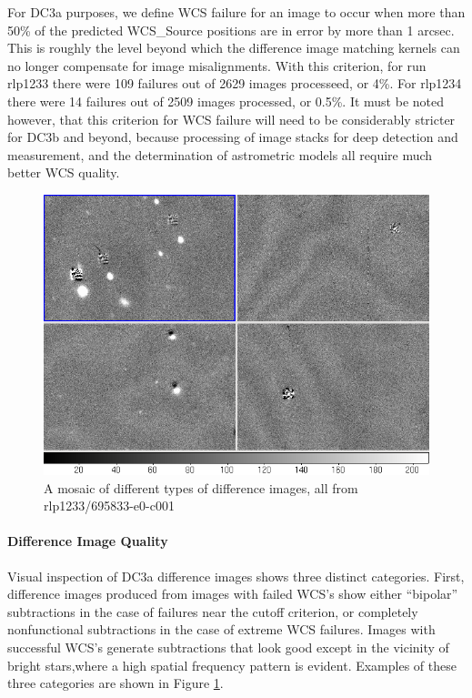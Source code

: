 For DC3a purposes, we define WCS failure for an image to occur when
more than 50\% of the predicted WCS\_Source positions are in error by
more than 1 arcsec.  This is roughly the level beyond which the difference
image matching kernels can no longer compensate for image misalignments. With
this criterion, for run rlp1233 there were 109 failures out of 2629
images processeed, or 4\%.   For rlp1234 there were 14 failures out
of 2509 images processed, or 0.5\%.  It must be noted however, that
this criterion for WCS failure will need to be considerably stricter
for DC3b and beyond, because processing of image stacks for deep
detection and measurement, and the determination of astrometric models
all require much better WCS quality.

\begin{figure}[htb]
\begin{center}
\includegraphics[width=6in]{images/rlp1233_v695833-e0-c001-mosaic.png}
\caption{A mosaic of different types of difference images, all from rlp1233/695833-e0-c001}  
\label{fig:diffim1}
\end{center}
\end{figure}

\paragraph{Difference Image Quality}

Visual inspection of DC3a difference images shows three distinct
categories. First, difference images produced from images with failed 
WCS's show either ``bipolar'' subtractions in the case of failures
near the cutoff criterion, or completely nonfunctional subtractions in
the case of extreme WCS failures.  Images with successful WCS's
generate subtractions that look good except in the vicinity of bright
stars,where a high spatial frequency pattern is evident.  Examples of
these three categories are shown in Figure \ref{fig:diffim1}.

